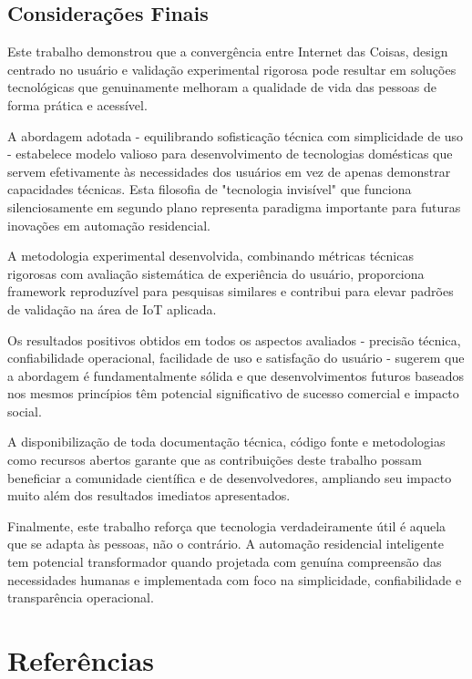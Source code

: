 \documentclass[twoside,english,brazilian]{UNISINOSmonografia}
\begin{document}
\section{Considerações Finais}

Este trabalho demonstrou que a convergência entre Internet das Coisas, design centrado no usuário e validação experimental rigorosa pode resultar em soluções tecnológicas que genuinamente melhoram a qualidade de vida das pessoas de forma prática e acessível.

A abordagem adotada - equilibrando sofisticação técnica com simplicidade de uso - estabelece modelo valioso para desenvolvimento de tecnologias domésticas que servem efetivamente às necessidades dos usuários em vez de apenas demonstrar capacidades técnicas. Esta filosofia de "tecnologia invisível" que funciona silenciosamente em segundo plano representa paradigma importante para futuras inovações em automação residencial.

A metodologia experimental desenvolvida, combinando métricas técnicas rigorosas com avaliação sistemática de experiência do usuário, proporciona framework reproduzível para pesquisas similares e contribui para elevar padrões de validação na área de IoT aplicada.

Os resultados positivos obtidos em todos os aspectos avaliados - precisão técnica, confiabilidade operacional, facilidade de uso e satisfação do usuário - sugerem que a abordagem é fundamentalmente sólida e que desenvolvimentos futuros baseados nos mesmos princípios têm potencial significativo de sucesso comercial e impacto social.

A disponibilização de toda documentação técnica, código fonte e metodologias como recursos abertos garante que as contribuições deste trabalho possam beneficiar a comunidade científica e de desenvolvedores, ampliando seu impacto muito além dos resultados imediatos apresentados.

Finalmente, este trabalho reforça que tecnologia verdadeiramente útil é aquela que se adapta às pessoas, não o contrário. A automação residencial inteligente tem potencial transformador quando projetada com genuína compreensão das necessidades humanas e implementada com foco na simplicidade, confiabilidade e transparência operacional.

\chapter*{Referências}
\end{document}
